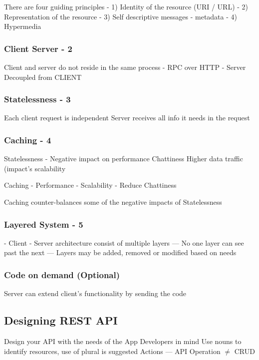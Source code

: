 \documentclass[a4paper, 11pt]{book}
\begin{document}
    There are four guiding principles
    - 1) Identity of the resource (URI / URL)
    - 2) Representation of the resource
    - 3) Self descriptive messages - metadata
    - 4) Hypermedia

    \subsubsection{Client Server - 2}
    Client and server do not reside in the same process
    - RPC over HTTP
    - Server Decoupled from CLIENT

    \subsubsection{Statelessness - 3}
    Each client request is independent
    Server receives all info it needs in the request

    \subsubsection{Caching - 4}
    Statelessness - Negative impact on performance
    Chattiness
    Higher data traffic (impact's scalability

    Caching - Performance
    - Scalability
    - Reduce Chattiness

    Caching counter-balances some of the negative impacts of Statelessness

    \subsubsection{Layered System - 5}
    - Client - Server architecture consist of multiple layers
    --- No one layer can see past the next
    --- Layers may be added, removed or modified based on needs

    \subsubsection{Code on demand (Optional)}
    Server can extend client's functionality by sending the code

    \subsection{Designing REST API}
    Design your API with the needs of the App Developers in mind
    Use nouns to identify resources, use of plural is suggested
    Actions
    --- API Operation $ \neq $ CRUD
\end{document}
